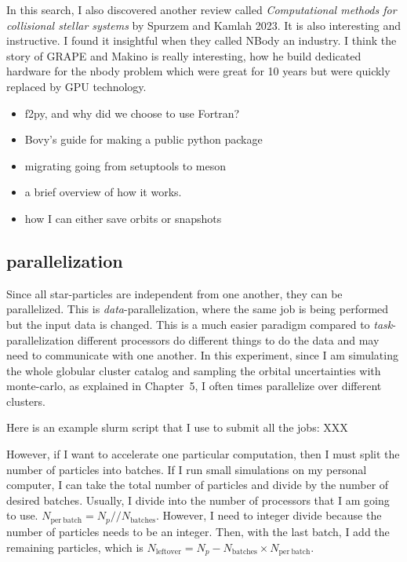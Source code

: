     In this search, I also discovered another review called \textit{Computational methods for collisional stellar systems} by Spurzem and Kamlah 2023. It is also interesting and instructive. I found it insightful when they called NBody an industry. I think the story of GRAPE and Makino is really interesting, how he build dedicated hardware for the nbody problem which were great for 10 years but were quickly replaced by GPU technology. 
    \begin{itemize}
        \item f2py, and why did we choose to use Fortran? 
        \item Bovy's guide for making a public python package
        \item migrating going from setuptools to meson
        \item a brief overview of how it works. 
        \item how I can either save orbits or snapshots
    \end{itemize}


        \subsection{parallelization}
            Since all star-particles are independent from one another, they can be parallelized. This is \textit{data}-parallelization, where the same job is being performed but the input data is changed. This is a much easier paradigm compared to \textit{task}-parallelization different processors do different things to do the data and may need to communicate with one another. In this experiment, since I am simulating the whole globular cluster catalog and sampling the orbital uncertainties with monte-carlo, as explained in Chapter~5, I often times parallelize over different clusters. 
            
            Here is an example slurm script that I use to submit all the jobs: XXX
            
            However, if I want to accelerate one particular computation, then I must split the number of particles into batches. If I run small simulations on my personal computer, I can take the total number of particles and divide by the number of desired batches. Usually, I divide into the number of processors that I am going to use. $N_\mathrm{per~batch}=N_p//N_\mathrm{batches}$. However, I need to integer divide because the number of particles needs to be an integer. Then, with the last batch, I add the remaining particles, which is $N_\mathrm{left over} = N_p - N_\mathrm{batches} \times N_\mathrm{per~batch}$. 



